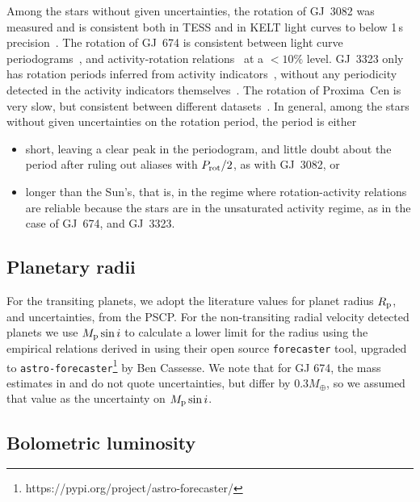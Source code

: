 \documentclass[twocolumn]{aastex631}
\begin{document}
Among the stars without given uncertainties, the rotation of GJ~3082 was measured and is consistent both in TESS and in KELT light curves to below 1\,s precision~\citep{gunther2020stellar}. The rotation of GJ~674 is consistent between light curve periodograms~\citep{kiraga2007agerotationactivity}, and activity-rotation relations~\citep{boisse2011disentangling} at a $<10\%$ level. GJ~3323 only has rotation periods inferred from activity indicators~\citep{astudillo-defru2017magnetic}, without any periodicity detected in the activity indicators themselves~\citep{astudillo-defru2017harps}. The rotation of Proxima~Cen is very slow, but consistent between different datasets~\citep{anglada-escude2016terrestrial, kiraga2007agerotationactivity}. In general, among the stars without given uncertainties on the rotation period, the period is either 
\begin{itemize}
    \item short, leaving a clear peak in the periodogram, and little doubt about the period after ruling out aliases with $P_{\rm rot}/2$, as with GJ~3082, or
    \item longer than the Sun's, that is, in the regime where rotation-activity relations are reliable because the stars are in the unsaturated activity regime, as in the case of GJ~674, and GJ~3323.
\end{itemize} 


\subsection{Planetary radii}
\label{sec:data:planetradii}
For the transiting planets, we adopt the literature values for planet radius $R_{\rm p}$, and uncertainties, from the PSCP. For the non-transiting radial velocity detected planets we use  $M_{\rm p}\sin i$ to calculate a lower limit for the radius using the empirical relations derived in \cite{chen2017probabilistic} using their open source \texttt{forecaster} tool, upgraded to \texttt{astro-forecaster}\footnote{https://pypi.org/project/astro-forecaster/} by Ben Cassesse. We note that for GJ 674, the mass estimates in \cite{bonfils2007harps} and \cite{boisse2011disentangling} do not quote uncertainties, but differ by $0.3M_\oplus$, so we assumed that value as the uncertainty on $M_{\rm p}\sin i$.

\subsection{Bolometric luminosity}
\label{sec:data:lum}
\end{document}
